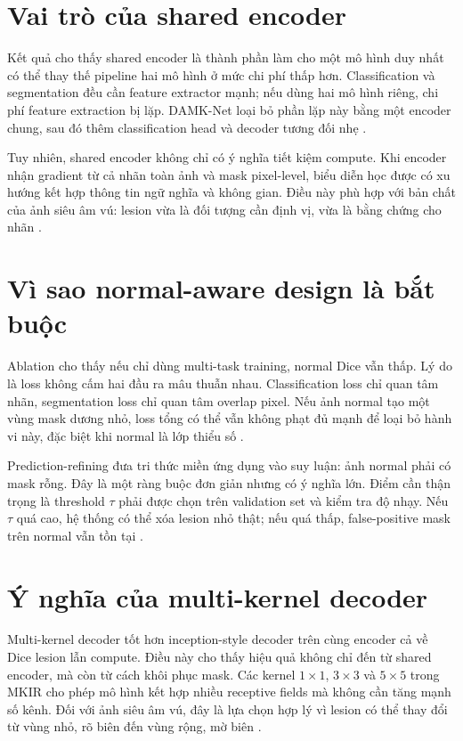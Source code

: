 \documentclass[12pt,a4paper,oneside]{report}
\newcommand{\modelname}{DAMK-Net}
\begin{document}
\section{Vai trò của shared encoder}

Kết quả cho thấy shared encoder là thành phần làm cho một mô hình duy nhất có thể thay thế pipeline hai mô hình ở mức chi phí thấp hơn. Classification và segmentation đều cần feature extractor mạnh; nếu dùng hai mô hình riêng, chi phí feature extraction bị lặp. \modelname{} loại bỏ phần lặp này bằng một encoder chung, sau đó thêm classification head và decoder tương đối nhẹ \citep{zhou,aumente,damknet}.

Tuy nhiên, shared encoder không chỉ có ý nghĩa tiết kiệm compute. Khi encoder nhận gradient từ cả nhãn toàn ảnh và mask pixel-level, biểu diễn học được có xu hướng kết hợp thông tin ngữ nghĩa và không gian. Điều này phù hợp với bản chất của ảnh siêu âm vú: lesion vừa là đối tượng cần định vị, vừa là bằng chứng cho nhãn \citep{busi,aumente,damknet}.

\section{Vì sao normal-aware design là bắt buộc}

Ablation cho thấy nếu chỉ dùng multi-task training, normal Dice vẫn thấp. Lý do là loss không cấm hai đầu ra mâu thuẫn nhau. Classification loss chỉ quan tâm nhãn, segmentation loss chỉ quan tâm overlap pixel. Nếu ảnh normal tạo một vùng mask dương nhỏ, loss tổng có thể vẫn không phạt đủ mạnh để loại bỏ hành vi này, đặc biệt khi normal là lớp thiểu số \citep{aumente,damknet}.

Prediction-refining đưa tri thức miền ứng dụng vào suy luận: ảnh normal phải có mask rỗng. Đây là một ràng buộc đơn giản nhưng có ý nghĩa lớn. Điểm cần thận trọng là threshold $\tau$ phải được chọn trên validation set và kiểm tra độ nhạy. Nếu $\tau$ quá cao, hệ thống có thể xóa lesion nhỏ thật; nếu quá thấp, false-positive mask trên normal vẫn tồn tại \citep{aumente,damknet}.

\section{Ý nghĩa của multi-kernel decoder}

Multi-kernel decoder tốt hơn inception-style decoder trên cùng encoder cả về Dice lesion lẫn compute. Điều này cho thấy hiệu quả không chỉ đến từ shared encoder, mà còn từ cách khôi phục mask. Các kernel $1\times1$, $3\times3$ và $5\times5$ trong MKIR cho phép mô hình kết hợp nhiều receptive fields mà không cần tăng mạnh số kênh. Đối với ảnh siêu âm vú, đây là lựa chọn hợp lý vì lesion có thể thay đổi từ vùng nhỏ, rõ biên đến vùng rộng, mờ biên \citep{mkunet,damknet}.
\end{document}

